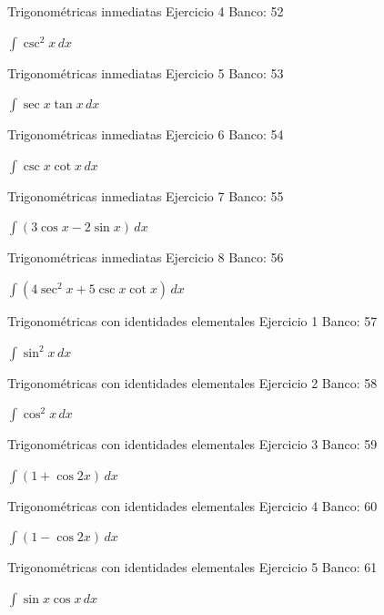 \documentclass[aspectratio=169,12pt]{beamer}
\newcommand{\ejercicio}[1]{%
  \begin{center}
  \vfill
  {\fontsize{24}{30}\selectfont #1}
  \vfill
  \end{center}
}
\begin{document}
\begin{frame}{Trigonométricas inmediatas}
\small Ejercicio 4 \hfill Banco: 52
\ejercicio{$\displaystyle \int\csc^2x\,dx$}
\end{frame}

\begin{frame}{Trigonométricas inmediatas}
\small Ejercicio 5 \hfill Banco: 53
\ejercicio{$\displaystyle \int\sec x\tan x\,dx$}
\end{frame}

\begin{frame}{Trigonométricas inmediatas}
\small Ejercicio 6 \hfill Banco: 54
\ejercicio{$\displaystyle \int\csc x\cot x\,dx$}
\end{frame}

\begin{frame}{Trigonométricas inmediatas}
\small Ejercicio 7 \hfill Banco: 55
\ejercicio{$\displaystyle \int(3\cos x-2\sin x)\,dx$}
\end{frame}

\begin{frame}{Trigonométricas inmediatas}
\small Ejercicio 8 \hfill Banco: 56
\ejercicio{$\displaystyle \int(4\sec^2x+5\csc x\cot x)\,dx$}
\end{frame}

\begin{frame}{Trigonométricas con identidades elementales}
\small Ejercicio 1 \hfill Banco: 57
\ejercicio{$\displaystyle \int\sin^2x\,dx$}
\end{frame}

\begin{frame}{Trigonométricas con identidades elementales}
\small Ejercicio 2 \hfill Banco: 58
\ejercicio{$\displaystyle \int\cos^2x\,dx$}
\end{frame}

\begin{frame}{Trigonométricas con identidades elementales}
\small Ejercicio 3 \hfill Banco: 59
\ejercicio{$\displaystyle \int(1+\cos 2x)\,dx$}
\end{frame}

\begin{frame}{Trigonométricas con identidades elementales}
\small Ejercicio 4 \hfill Banco: 60
\ejercicio{$\displaystyle \int(1-\cos 2x)\,dx$}
\end{frame}

\begin{frame}{Trigonométricas con identidades elementales}
\small Ejercicio 5 \hfill Banco: 61
\ejercicio{$\displaystyle \int\sin x\cos x\,dx$}
\end{frame}
\end{document}
